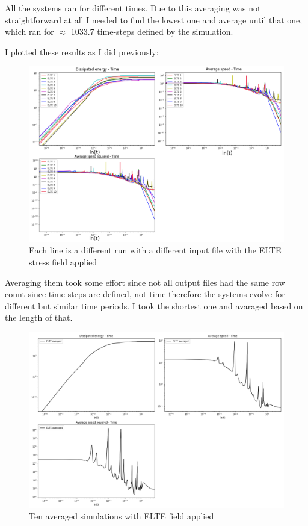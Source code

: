 \documentclass[12pt,a4paper]{article}
\theoremstyle{plain}
\begin{document}
\begin{multicols*}{2}
	\par All the systems ran for different times. Due to this averaging was not straightforward
	at all I needed to find the lowest one and average until that one, which ran for $\approx$ 1033.7
	time-steps defined by the simulation.

	\par I plotted these results as I did previously:

	\begin{figure}[H]
		\centering
		\includegraphics[width=0.99\columnwidth]{all_elte.png}
		\caption{Each line is a different run with a different input file with the ELTE stress field applied}
	\end{figure}

	\par Averaging them took some effort since not all output files had the same row count since
	time-steps are defined, not time therefore the systems evolve for different but similar
	time periods. I took the shortest one and avaraged based on the length of that.

	\begin{figure}[H]
		\centering
		\includegraphics[width=0.99\columnwidth]{all_elte_averaged.png}
		\caption{Ten averaged simulations with ELTE field applied}
		\label{fig:avg}
	\end{figure}


\end{multicols*}
\end{document}
